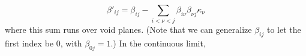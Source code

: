 \begin{equation}
  \beta'_{ij} = \beta_{ij} - \sum_{i<\nu<j} \beta_{i\nu} \beta_{\nu j} \kappa_\nu
\end{equation}
where this sum runs over void planes.  (Note that we can generalize $\beta_{ij}$ to let the first index be 0, with $\beta_{0j} = 1$.)  In the continuous limit,